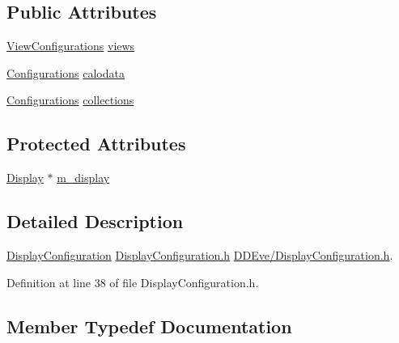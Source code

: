 \subsection*{Public Attributes}
\begin{DoxyCompactItemize}
\item 
\hyperlink{class_d_d4hep_1_1_display_configuration_a38d6c82b57ac859a5d5cf67fe26f4920}{View\+Configurations} \hyperlink{class_d_d4hep_1_1_display_configuration_a630bc25ef7e739a5067c72b6b7996527}{views}
\item 
\hyperlink{class_d_d4hep_1_1_display_configuration_ac43586ae2c70f106cc9027d452d383d7}{Configurations} \hyperlink{class_d_d4hep_1_1_display_configuration_a8ff4fbadd2821a8dbbc0f5006f60357f}{calodata}
\item 
\hyperlink{class_d_d4hep_1_1_display_configuration_ac43586ae2c70f106cc9027d452d383d7}{Configurations} \hyperlink{class_d_d4hep_1_1_display_configuration_af92e64fe8730543b07e698279dd23f7a}{collections}
\end{DoxyCompactItemize}
\subsection*{Protected Attributes}
\begin{DoxyCompactItemize}
\item 
\hyperlink{class_d_d4hep_1_1_display}{Display} $\ast$ \hyperlink{class_d_d4hep_1_1_display_configuration_aafc55c829834377c847861133f87637a}{m\+\_\+display}
\end{DoxyCompactItemize}


\subsection{Detailed Description}
\hyperlink{class_d_d4hep_1_1_display_configuration}{Display\+Configuration} \hyperlink{_display_configuration_8h}{Display\+Configuration.\+h} \hyperlink{_display_configuration_8h}{D\+D\+Eve/\+Display\+Configuration.\+h}. 

Definition at line 38 of file Display\+Configuration.\+h.



\subsection{Member Typedef Documentation}
\hypertarget{class_d_d4hep_1_1_display_configuration_ac43586ae2c70f106cc9027d452d383d7}{}\label{class_d_d4hep_1_1_display_configuration_ac43586ae2c70f106cc9027d452d383d7} 
